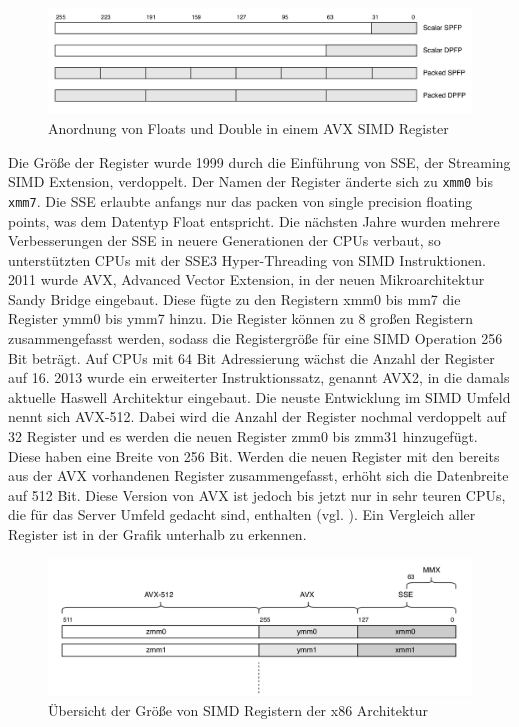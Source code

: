\documentclass[../main.tex]{subfiles}
\begin{document}
\begin{figure}[!htbp]
	\centering
	\includegraphics[width=\textwidth]{../images/Benz/avx_packed_scalar.png}
	\caption{Anordnung von Floats und Double in einem AVX SIMD Register} 
	\label{fig:avx_packed_scalar}
\end{figure}

Die Größe der Register wurde 1999 durch die Einführung von SSE, der Streaming SIMD Extension, verdoppelt. Der Namen der Register änderte sich zu \texttt{xmm0} bis \texttt{xmm7}. Die SSE erlaubte anfangs nur das packen von single precision floating points, was dem Datentyp Float entspricht. Die nächsten Jahre wurden mehrere Verbesserungen der SSE in neuere Generationen der CPUs verbaut, so unterstützten CPUs mit der SSE3 Hyper-Threading von SIMD Instruktionen.
2011 wurde AVX, Advanced Vector Extension, in der neuen Mikroarchitektur Sandy Bridge eingebaut. Diese fügte zu den Registern xmm0 bis mm7 die Register ymm0 bis ymm7 hinzu. Die Register können zu 8 großen Registern zusammengefasst werden, sodass die Registergröße für eine SIMD Operation 256 Bit beträgt. Auf CPUs mit 64 Bit Adressierung wächst die Anzahl der Register auf 16. 2013 wurde ein erweiterter Instruktionssatz, genannt AVX2, in die damals aktuelle Haswell Architektur eingebaut.
Die neuste Entwicklung im SIMD Umfeld nennt sich AVX-512. Dabei wird die Anzahl der Register nochmal verdoppelt auf 32 Register und es werden die neuen Register zmm0 bis zmm31 hinzugefügt. Diese haben eine Breite von 256 Bit. Werden die neuen Register mit den bereits aus der AVX vorhandenen Register zusammengefasst, erhöht sich die Datenbreite auf 512 Bit. Diese Version von AVX ist jedoch bis jetzt nur in sehr teuren CPUs, die für das Server Umfeld gedacht sind, enthalten (vgl. \cite{IntelAvx512}).
Ein Vergleich aller Register ist in der Grafik unterhalb zu erkennen.

\begin{figure}[!htbp]
	\centering
	\includegraphics[width=\textwidth]{../images/Benz/simd_avx_sse_mmx.png}
	\caption{Übersicht der Größe von SIMD Registern der x86 Architektur} 
	\label{fig:simd_avx_sse_mmx}
\end{figure}
\end{document}
